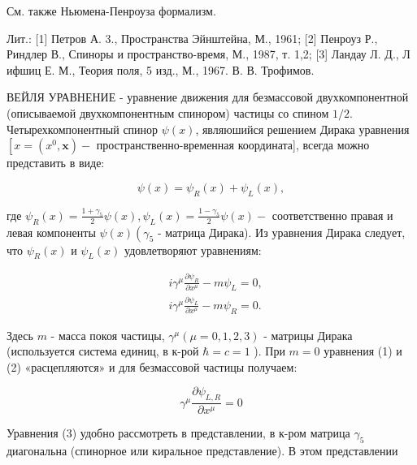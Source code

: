 \documentclass[10pt]{article}
\begin{document}
См. также Ньюмена-Пенроуза формализм.



Лит.: [1] Петров А. 3., Пространства Эйнштейна, М., 1961; [2] Пенроуз Р., Риндлер В., Спиноры и пространство-время, М., 1987, т. 1,2; [3] Ландау Л. Д., Л ифшиц Е. М., Теория поля, 5 изд., М., 1967. В. В. Трофимов.



ВЕЙЛЯ УРАВНЕНИЕ - уравнение движения для безмассовой двухкомпонентной (описываемой двухкомпонентным спинором) частицы со спином $1 / 2$. Четырехкомпонентный спинор $\psi(x)$, являюшийся решением Дирака уравнения $\left[x=\left(x^{0}, \boldsymbol{x}\right)-\right.$ пространственно-временная координата], всегда можно представить в виде:



\[

\psi(x)=\psi_{R}(x)+\psi_{L}(x),

\]



где $\psi_{R}(x)=\frac{1+\gamma_{5}}{2} \psi(x), \psi_{L}(x)=\frac{1-\gamma_{5}}{2} \psi(x)-$ соответственно правая и левая компоненты $\psi(x)\left(\gamma_{5}\right.$ - матрица Дирака). Из уравнения Дирака следует, что $\psi_{R}(x)$ и $\psi_{L}(x)$ удовлетворяют уравнениям:



\[

\begin{aligned}

& i \gamma^{\mu} \frac{\partial \psi_{R}}{\partial x^{\mu}}-m \psi_{L}=0, \\

& i \gamma^{\mu} \frac{\partial \psi_{L}}{\partial x^{\mu}}-m \psi_{R}=0 .

\end{aligned}

\]



Здесь $m$ - масса покоя частицы, $\gamma^{\mu}(\mu=0,1,2,3)$ - матрицы Дирака (используется система единиц, в к-рой $\hbar=c=1$ ). При $m=0$ уравнения (1) и (2) «расцепляются» и для безмассовой частицы получаем:



\[

\gamma^{\mu} \frac{\partial \psi_{L, R}}{\partial x^{\mu}}=0

\]



Уравнения (3) удобно рассмотреть в представлении, в к-ром матрица $\gamma_{5}$ диагональна (спинорное или киральное представление). В этом представлении
\end{document}
